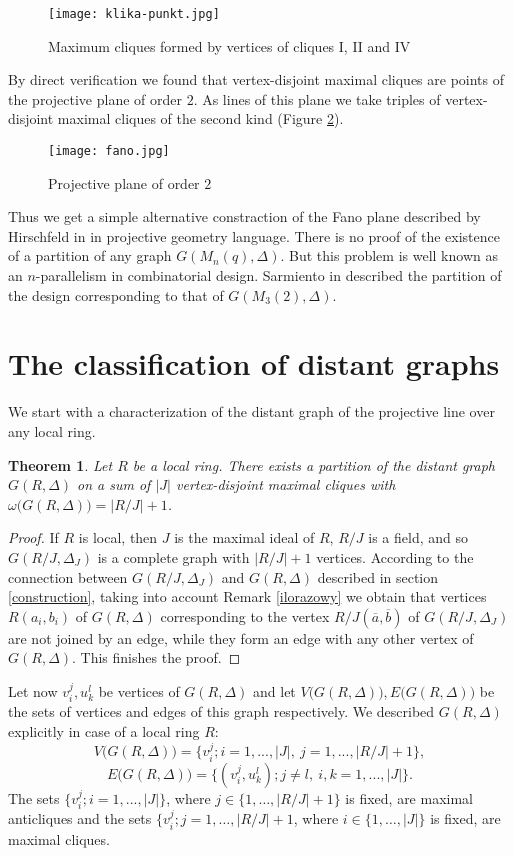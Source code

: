 \documentclass[12pt,a4paper]{article}
\newtheorem{theorem}{Theorem}
\theoremstyle{definition}
\begin{document}
\begin{figure}[h]
\centerline{\texttt{[image: klika-punkt.jpg]}}
\caption{Maximum cliques formed by vertices of  cliques I, II and IV}
\label{disjoint.cliques}
\end{figure}
\newpage
By direct verification we found that vertex-disjoint maximal cliques are points of the projective plane of order $2$. As lines of this plane we take triples of vertex-disjoint maximal cliques of the second kind (Figure \ref{fano}).
\begin{figure}[h]
\centerline{\texttt{[image: fano.jpg]}}
\caption{Projective plane of order $2$}
\label{fano}
\end{figure}\newline
Thus we get a simple alternative constraction of the Fano plane described by Hirschfeld in \cite[Theorem 17.5.6]{hir} in projective geometry language.
\newline
There is no proof of the existence of a partition of any graph  $G(M_n(q), \Delta)$. But this problem is well known as an $n$-parallelism in combinatorial design. Sarmiento in \cite{sarmiento} described the partition of the design corresponding to that of  $G(M_3(2), \Delta)$.

\section{The classification of distant graphs}
We start with a characterization of the distant graph of the projective line over any local ring.
\begin{theorem}
\label{local}
Let $R$ be a local ring.
There exists a partition of the distant graph $G(R, \Delta)$ on a sum of $|J|$ vertex-disjoint maximal cliques with  $\omega\bigl(G(R, \Delta)\bigr)=|R/J|+1$.
\end{theorem}
\begin{proof}
If $R$ is local, then $J$ is the maximal ideal of $R$, $R/J$ is a field, and so $G(R/J, \Delta_J)$ is a complete graph with $|R/J|+1$ vertices. According to the connection between $G(R/J, \Delta_J)$ and $G(R, \Delta)$ described in section \ref{construction}, taking into account Remark \ref{ilorazowy} we obtain that vertices $R(a_i, b_i)$ of $G(R, \Delta)$ corresponding to the vertex $R/J(\overline{a}, \overline{b})$ of $G(R/J, \Delta_J)$ are not joined by an edge, while they form an edge with any other vertex of $G(R, \Delta)$. This finishes the proof.
\end{proof}
Let now $v_i^j, u_k^l$ be vertices of $G(R, \Delta)$ and let $V\big(G(R, \Delta)\big), E\big(G(R, \Delta)\big)$ be the sets of vertices and edges of this graph respectively.  We described $G(R, \Delta)$ explicitly in case of a local ring $R$:
$$V\big(G(R, \Delta)\big)=\{v_i^j; i=1, ..., |J|, \ j=1, ..., |R/J|+1\},$$
$$E\big(G(R, \Delta)\big)=\{(v_i^j, u_k^l); j\neq l, \ i,k=1, ..., |J|\}.$$
The sets $\{v_i^j; i=1, ..., |J|\}$, where $j\in\{1,\ldots,|R/J|+1\}$ is
fixed, are maximal anticliques and the sets $\{v_i^j;
j=1,\ldots,|R/J|+1$, where $i\in\{1,\ldots,|J|\}$ is fixed, are maximal
cliques.\newline 
\end{document}
